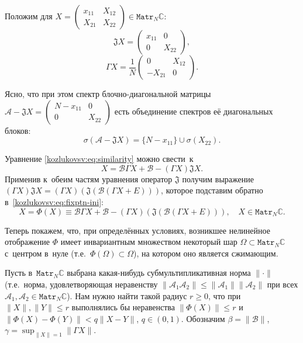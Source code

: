 Положим для \( X =
    \begin{pmatrix}
    x_{11} & X_{12} \\
    X_{21} & X_{22}
    \end{pmatrix} \in \mathtt{Matr}_N\mathbb{C} \):
\[
    \mathfrak{J} X = \begin{pmatrix} x_{11} & 0 \\ 0 & X_{22} \end{pmatrix}, \]
\[
    \Gamma X = \frac{1}{N}\begin{pmatrix} 0 & X_{12} \\ -X_{21} & 0 \end{pmatrix}. \]

Ясно, что при этом спектр блочно-диагональной матрицы
\( \mathcal{A} - \mathfrak{J}X = \begin{pmatrix} N - x_{11} & 0 \\ 0 & X_{22} \end{pmatrix} \)
есть объединение спектров е\"е диагональных блоков:
\[ \sigma(\mathcal{A} - \mathfrak{J} X) = \{ N - x_{11} \} \cup \sigma(X_{22}). \]

Уравнение \eqref{kozlukovsv:eq:similarity} можно свести~к
\begin{equation}\label{kozlukovsv:eq:fixptn-ini}
    X = \mathcal{B} \Gamma X + \mathcal{B} - (\Gamma X) \mathfrak{J} X.
\end{equation}
Применив к~обеим частям уравнения оператор \( \mathfrak{J} \) получим выражение
 \( (\Gamma X) \mathfrak{J} X = (\Gamma X)(\mathfrak{J}(\mathcal{B} (\Gamma X + E))) \),
 которое подставим обратно в~\eqref{kozlukovsv:eq:fixptn-ini}:
\begin{equation}\label{kozlukovsv:eq:fixptn}
    X = \Phi(X) \equiv \mathcal{B} \Gamma X + \mathcal{B} - (\Gamma X)(\mathfrak{J}(\mathcal{B} (\Gamma X + E))), \quad X\in\mathtt{Matr}_N\mathbb{C}.
\end{equation}

Теперь покажем, что, при определ\"енных условиях,
возникшее нелинейное отображение \( \Phi \) имеет инвариантным множеством
некоторый шар \( \Omega \subset \mathtt{Matr}_N\mathbb{C} \) с~центром в~нуле
(т.е.~\( \Phi(\Omega)\subset\Omega \)),
на котором оно является сжимающим.

Пусть в~\( \mathtt{Matr}_N\mathbb{C} \)
выбрана какая-нибудь субмультипликативная норма \( \|\cdot\| \)
(т.е.~норма, удовлетворяющая неравенству
 \( \| \mathcal{A}_1\mathcal{A}_2 \| \leq \|\mathcal{A}_1\|\|\mathcal{A}_2\| \)
 при всех \( \mathcal{A}_1, \mathcal{A}_2 \in \mathtt{Matr}_N\mathbb{C} \)).
Нам нужно найти такой радиус \( r \geq 0 \),
что при \( \|X\|,\|Y\| \leq r \) выполнялись бы неравенства \( \|\Phi(X)\| \leq r \)
и~\( \|\Phi(X) - \Phi(Y)\| < q\|X-Y\| \), \( q\in(0,1) \).
Обозначим
\( \beta = \|\mathcal{B}\| \), \( \gamma = \sup_{\|X\|=1} \|\Gamma X\| \).

